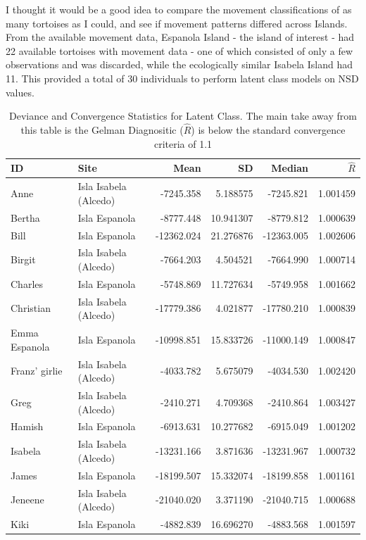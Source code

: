 \documentclass{article}
\begin{document}
I thought it would be a good idea to compare the movement
classifications of as many tortoises as I could, and see if movement
patterns differed across Islands. From the available movement data,
Espanola Island - the island of interest - had 22 available tortoises
with movement data - one of which consisted of only a few observations
and was discarded, while the ecologically similar Isabela Island had 11.
This provided a total of 30 individuals to perform latent class models
on NSD values.

\begin{table}

\caption{\label{tab:unnamed-chunk-6}Deviance and Convergence Statistics for Latent Class. The main take away from this table is the Gelman Diagnositic ($\hat{R}$) is below the standard convergence criteria of 1.1}
\centering
\begin{tabular}[t]{llrrrr}
\toprule
ID & Site & Mean & SD & Median & $\hat{R}$\\
\midrule
Anne & Isla Isabela (Alcedo) & -7245.358 & 5.188575 & -7245.821 & 1.001459\\
Bertha & Isla Espanola & -8777.448 & 10.941307 & -8779.812 & 1.000639\\
Bill & Isla Espanola & -12362.024 & 21.276876 & -12363.005 & 1.002606\\
Birgit & Isla Isabela (Alcedo) & -7664.203 & 4.504521 & -7664.990 & 1.000714\\
Charles & Isla Espanola & -5748.869 & 11.727634 & -5749.958 & 1.001662\\
Christian & Isla Isabela (Alcedo) & -17779.386 & 4.021877 & -17780.210 & 1.000839\\
Emma Espanola & Isla Espanola & -10998.851 & 15.833726 & -11000.149 & 1.000847\\
Franz' girlie & Isla Isabela (Alcedo) & -4033.782 & 5.675079 & -4034.530 & 1.002420\\
Greg & Isla Isabela (Alcedo) & -2410.271 & 4.709368 & -2410.864 & 1.003427\\
Hamish & Isla Espanola & -6913.631 & 10.277682 & -6915.049 & 1.001202\\
Isabela & Isla Isabela (Alcedo) & -13231.166 & 3.871636 & -13231.967 & 1.000732\\
James & Isla Espanola & -18199.507 & 15.332074 & -18199.858 & 1.001161\\
Jeneene & Isla Isabela (Alcedo) & -21040.020 & 3.371190 & -21040.715 & 1.000688\\
Kiki & Isla Espanola & -4882.839 & 16.696270 & -4883.568 & 1.001597\\

\end{tabular}
\end{table}
\end{document}
